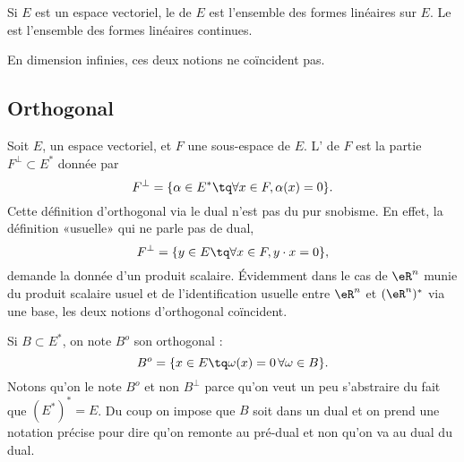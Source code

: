\begin{definition}  \label{DefJPGSHpn}
    Si \( E\) est un espace vectoriel, le  de \( E\) est l'ensemble des formes linéaires sur \( E\). Le  est l'ensemble des formes linéaires continues.

    En dimension infinies, ces deux notions ne coïncident pas.
\end{definition}

\subsection{Orthogonal}

Soit \( E\), un espace vectoriel, et \( F\) une sous-espace de \( E\). L' de \( F\) est la partie \( F^{\perp}\subset E^*\) donnée par
\begin{equation}    \label{Eqiiyple}
    F^{\perp}=\{ \alpha\in E^*\tq \forall x\in F,\alpha(x)=0 \}.
\end{equation}
Cette définition d'orthogonal via le dual n'est pas du pur snobisme. En effet, la définition «usuelle» qui ne parle pas de dual,
\begin{equation}
    F^{\perp}=\{ y\in E\tq \forall x\in F,y\cdot x=0 \},
\end{equation}
demande la donnée d'un produit scalaire. Évidemment dans le cas de \( \eR^n\) munie du produit scalaire usuel et de l'identification usuelle entre \( \eR^n\) et \( (\eR^n)^*\) via une base, les deux notions d'orthogonal coïncident.

Si \( B\subset E^*\), on note \( B^o\) son orthogonal :
\begin{equation}
    B^o=\{ x\in E\tq \omega(x)=0\,\forall \omega\in B \}.
\end{equation}
Notons qu'on le note \( B^o\) et non \( B^{\perp}\) parce qu'on veut un peu s'abstraire du fait que \( (E^*)^*=E\). Du coup on impose que \( B\) soit dans un dual et on prend une notation précise pour dire qu'on remonte au pré-dual et non qu'on va au dual du dual.

